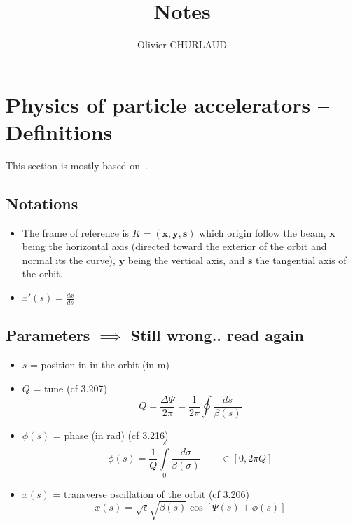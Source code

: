 \documentclass[12pt,a4paper]{article}
\author{Olivier CHURLAUD}
\title{Notes}
\begin{document}
	\maketitle
	\tableofcontents
	\section{Physics of particle accelerators -- Definitions}
	This section is mostly based on~\cite{book:wille}.
	
	\subsection{Notations}
	\begin{itemize}
		\item The frame of reference is $K = (\mathbf{x},\mathbf{y},\mathbf{s})$ which origin follow the beam, $\mathbf{x}$ being the horizontal axis (directed toward the exterior of the orbit and normal its the curve), $\mathbf{y}$ being the vertical axis, and $\mathbf{s}$ the tangential axis of the orbit.
		\item $x'(s) = \frac{dx}{ds}$
	\end{itemize}
	
	\subsection{Parameters $\implies$ Still wrong.. read again}
	\begin{itemize}
		\item $s$ = position in in the orbit (in m)
		\item $Q$ = tune (cf 3.207)
		\begin{equation}
			Q = \frac{\Delta \Psi}{2 \pi}= \frac{1}{2 \pi} \oint \frac{ds}{\beta(s)}
		\end{equation}
		
		\item $\phi(s)$ = phase (in rad)  (cf 3.216)
		\begin{equation}
			\phi(s) = \frac{1}{Q} \int\limits_{0}^s \frac{d\sigma}{\beta(\sigma)} \qquad \in [0, 2 \pi Q]
		\end{equation}
		
		\item $x(s)$ = transverse oscillation of the orbit (cf 3.206) 
		\begin{equation}
			x(s) = \sqrt{\epsilon}\sqrt{\beta(s)}\cos[\Psi(s)+\phi(s)]
		\end{equation}
	\end{itemize}
\end{document}
